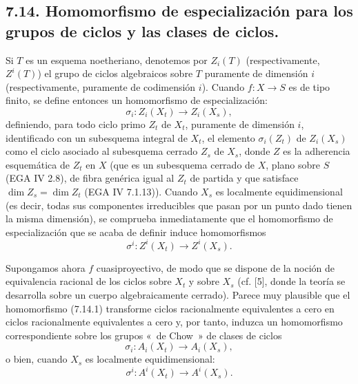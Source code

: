 \subsection*{7.14. Homomorfismo de especialización para los grupos de ciclos y las clases de ciclos.}
Si \(T\) es un esquema noetheriano, denotemos por \(Z_i(T)\) (respectivamente, \(Z^i(T)\)) el grupo de ciclos algebraicos sobre \(T\) puramente de dimensión \(i\) (respectivamente, puramente de codimensión \(i\)). Cuando \(f:X\to S\) es de tipo finito, se define entonces un homomorfismo de especialización:
\begin{equation}\tag{7.14.1}
  \sigma_i:Z_i(X_t)\longrightarrow Z_i(X_s),
\end{equation}
definiendo, para todo ciclo primo \(Z_t\) de \(X_t\), puramente de dimensión \(i\), identificado con un subesquema integral de \(X_t\), el elemento \(\sigma_i(Z_t)\) de \(Z_i(X_s)\) como el ciclo asociado al subesquema cerrado \(Z_s\) de \(X_s\), donde \(Z\) es la adherencia esquemática de \(Z_t\) en \(X\) (que es un subesquema cerrado de \(X\), plano sobre \(S\) (EGA IV 2.8), de fibra genérica igual al \(Z_t\) de partida y que satisface \(\dim Z_s=\dim Z_t\) (EGA IV 7.1.13)). Cuando \(X_s\) es localmente equidimensional (es decir, todas sus componentes irreducibles que pasan por un punto dado tienen la misma dimensión), se comprueba inmediatamente que el homomorfismo de especialización que se acaba de definir induce homomorfismos
\begin{equation}\tag{7.14.1 bis}
  \sigma^i:Z^i(X_t)\longrightarrow Z^i(X_s).
\end{equation}

Supongamos ahora \(f\) cuasiproyectivo, de modo que se dispone de la noción de equivalencia racional de los ciclos sobre \(X_t\) y sobre \(X_s\) (cf. [5], donde la teoría se desarrolla sobre un cuerpo algebraicamente cerrado). Parece muy plausible que el homomorfismo (7.14.1) transforme ciclos racionalmente equivalentes a cero en ciclos racionalmente equivalentes a cero y, por tanto, induzca un homomorfismo correspondiente sobre los grupos «~de Chow~» de clases de ciclos
\begin{equation}\tag{7.14.2}
  \sigma_i:A_i(X_t)\longrightarrow A_i(X_s),
\end{equation}
o bien, cuando \(X_s\) es localmente equidimensional:
\begin{equation}\tag{7.14.2 bis}
  \sigma^i:A^i(X_t)\longrightarrow A^i(X_s).
\end{equation}

